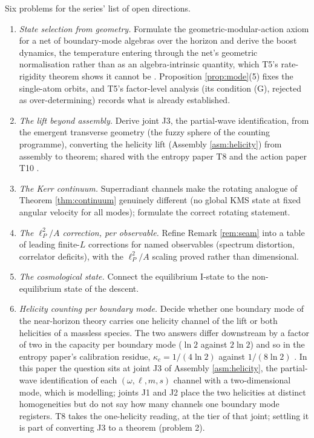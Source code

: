 Six problems for the series' list of open directions.

\begin{enumerate}
\item \emph{State selection from geometry.} Formulate the geometric-modular-action axiom for a net of boundary-mode algebras over the horizon and derive the boost dynamics, the temperature entering through the net's geometric normalisation rather than as an algebra-intrinsic quantity, which T5's rate-rigidity theorem shows it cannot be \cite[Thm.~7.16]{ButlerT5}. Proposition \ref{prop:mode}(5) fixes the single-atom orbits, and T5's factor-level analysis (its condition (G), rejected as over-determining) records what is already established.
\item \emph{The lift beyond assembly.} Derive joint J3, the partial-wave identification, from the emergent transverse geometry (the fuzzy sphere of the counting programme), converting the helicity lift (Assembly \ref{asm:helicity}) from assembly to theorem; shared with the entropy paper T8 \cite{ButlerT8} and the action paper T10 \cite{ButlerT10}.
\item \emph{The Kerr continuum.} Superradiant channels make the rotating analogue of Theorem \ref{thm:continuum} genuinely different (no global KMS state at fixed angular velocity for all modes); formulate the correct rotating statement.
\item \emph{The $\ell_P^2/A$ correction, per observable.} Refine Remark \ref{rem:seam} into a table of leading finite-$L$ corrections for named observables (spectrum distortion, correlator deficits), with the $\ell_P^2/A$ scaling proved rather than dimensional.
\item \emph{The cosmological state.} Connect the equilibrium I-state to the non-equilibrium state of the descent.
\item \emph{Helicity counting per boundary mode.} Decide whether one boundary mode of the near-horizon theory carries one helicity channel of the lift or both helicities of a massless species. The two answers differ downstream by a factor of two in the capacity per boundary mode ($\ln 2$ against $2\ln 2$) and so in the entropy paper's calibration residue, $\kappa_c = 1/(4\ln 2)$ against $1/(8\ln 2)$ \cite[Prop.~4.12]{ButlerT8}. In this paper the question sits at joint J3 of Assembly \ref{asm:helicity}, the partial-wave identification of each $(\omega, \ell, m, s)$ channel with a two-dimensional mode, which is modelling; joints J1 and J2 place the two helicities at distinct homogeneities but do not say how many channels one boundary mode registers. T8 takes the one-helicity reading, at the tier of that joint; settling it is part of converting J3 to a theorem (problem 2).
\end{enumerate}

